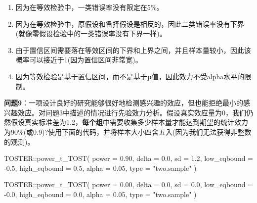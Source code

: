 \documentclass[
  letterpaper,
  DIV=11,
  numbers=noendperiod]{scrreprt}
\newenvironment{Shaded}{\begin{snugshade}}{\end{snugshade}}
\newcommand{\AttributeTok}[1]{\textcolor[rgb]{0.40,0.45,0.13}{#1}}
\newcommand{\FloatTok}[1]{\textcolor[rgb]{0.68,0.00,0.00}{#1}}
\newcommand{\FunctionTok}[1]{\textcolor[rgb]{0.28,0.35,0.67}{#1}}
\newcommand{\NormalTok}[1]{\textcolor[rgb]{0.00,0.23,0.31}{#1}}
\newcommand{\SpecialCharTok}[1]{\textcolor[rgb]{0.37,0.37,0.37}{#1}}
\newcommand{\StringTok}[1]{\textcolor[rgb]{0.13,0.47,0.30}{#1}}
\providecommand{\tightlist}{%
  \setlength{\itemsep}{0pt}\setlength{\parskip}{0pt}}\usepackage{longtable,booktabs,array}
\begin{document}
\begin{enumerate}
\def\labelenumi{\Alph{enumi})}
\tightlist
\item
  因为在等效检验中，一类错误率没有限定在5\%。
\item
  因为在等效检验中，原假设和备择假设是相反的，因此二类错误率没有下界(就像零假设检验中的一类错误率没有下界一样)。
\item
  由于置信区间需要落在等效区间的下界和上界之间，并且样本量较小，因此该概率可以接近于1(因为置信区间非常宽)。
\item
  因为等效检验是基于置信区间，而不是基于\textbf{p}值，因此效力不受alpha水平的限制。
\end{enumerate}

\textbf{问题9}：一项设计良好的研究能够很好地检测感兴趣的效应，但也能拒绝最小的感兴趣效应。对问题3中描述的情况进行先验效力分析。假设真实效应量为0，我们仍然假设真实标准差为1.2，\textbf{每个组}中需要收集多少样本量才能达到期望的统计效力为90\%(或0.9)?使用下面的代码，并将样本大小四舍五入(因为我们无法获得非整数的观测)。

\begin{Shaded}
\begin{Highlighting}[]
\NormalTok{TOSTER}\SpecialCharTok{::}\FunctionTok{power\_t\_TOST}\NormalTok{(}
  \AttributeTok{power =} \FloatTok{0.90}\NormalTok{,}
  \AttributeTok{delta =} \FloatTok{0.0}\NormalTok{,}
  \AttributeTok{sd =} \FloatTok{1.2}\NormalTok{,}
  \AttributeTok{low\_eqbound =} \SpecialCharTok{{-}}\FloatTok{0.5}\NormalTok{,}
  \AttributeTok{high\_eqbound =} \FloatTok{0.5}\NormalTok{,}
  \AttributeTok{alpha =} \FloatTok{0.05}\NormalTok{,}
  \AttributeTok{type =} \StringTok{"two.sample"}
\NormalTok{)}
\end{Highlighting}
\end{Shaded}

\begin{Shaded}
\begin{Highlighting}[]
\NormalTok{TOSTER}\SpecialCharTok{::}\FunctionTok{power\_t\_TOST}\NormalTok{(}
  \AttributeTok{power =} \FloatTok{0.00}\NormalTok{,}
  \AttributeTok{delta =} \FloatTok{0.0}\NormalTok{,}
  \AttributeTok{sd =} \FloatTok{0.0}\NormalTok{,}
  \AttributeTok{low\_eqbound =} \SpecialCharTok{{-}}\FloatTok{0.0}\NormalTok{,}
  \AttributeTok{high\_eqbound =} \FloatTok{0.0}\NormalTok{,}
  \AttributeTok{alpha =} \FloatTok{0.05}\NormalTok{,}
  \AttributeTok{type =} \StringTok{"two.sample"}
\NormalTok{)}
\end{Highlighting}
\end{Shaded}
\end{document}

